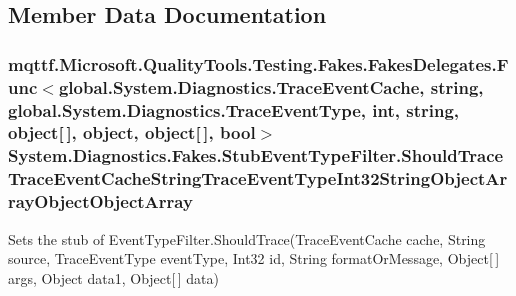 \subsection{Member Data Documentation}
\hypertarget{class_system_1_1_diagnostics_1_1_fakes_1_1_stub_event_type_filter_a45ea196f63cc173d0a0dd667b5c7883e}{
\subsubsection[{Should\-Trace\-Trace\-Event\-Cache\-String\-Trace\-Event\-Type\-Int32\-String\-Object\-Array\-Object\-Object\-Array}]{\setlength{\rightskip}{0pt plus 5cm}mqttf.\-Microsoft.\-Quality\-Tools.\-Testing.\-Fakes.\-Fakes\-Delegates.\-Func$<$global.\-System.\-Diagnostics.\-Trace\-Event\-Cache, string, global.\-System.\-Diagnostics.\-Trace\-Event\-Type, int, string, object\mbox{[}$\,$\mbox{]}, object, object\mbox{[}$\,$\mbox{]}, bool$>$ System.\-Diagnostics.\-Fakes.\-Stub\-Event\-Type\-Filter.\-Should\-Trace\-Trace\-Event\-Cache\-String\-Trace\-Event\-Type\-Int32\-String\-Object\-Array\-Object\-Object\-Array}}\label{class_system_1_1_diagnostics_1_1_fakes_1_1_stub_event_type_filter_a45ea196f63cc173d0a0dd667b5c7883e}


Sets the stub of Event\-Type\-Filter.\-Should\-Trace(\-Trace\-Event\-Cache cache, String source, Trace\-Event\-Type event\-Type, Int32 id, String format\-Or\-Message, Object\mbox{[}$\,$\mbox{]} args, Object data1, Object\mbox{[}$\,$\mbox{]} data)



